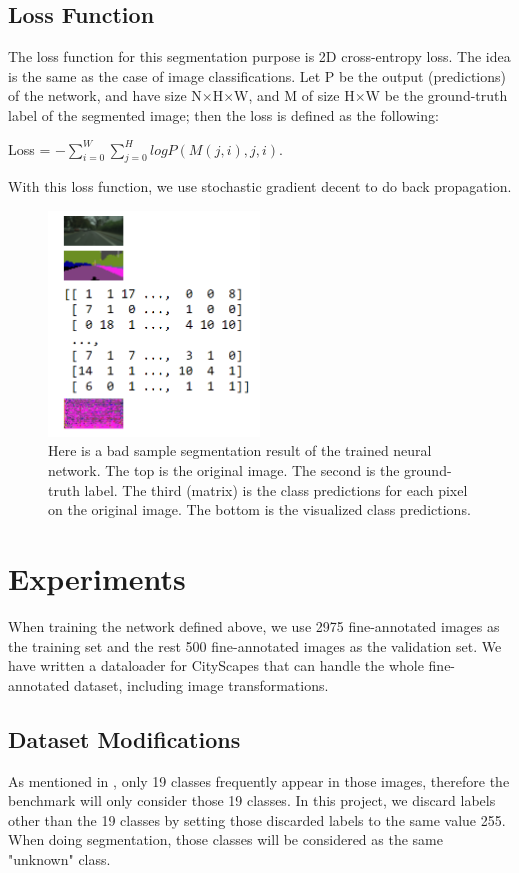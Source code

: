 \documentclass[10pt,twocolumn,letterpaper]{article}
\begin{document}
\subsection{Loss Function}
The loss function for this segmentation purpose is 2D cross-entropy loss. The idea is the same as the case of image classifications. Let P be the output (predictions) of the network, and have size N$\times$H$\times$W, and M of size H$\times$W be the ground-truth label of the segmented image; then the loss is defined as the following:
\begin{center}
	Loss = $-\sum_{i=0}^{W}\sum_{j=0}^{H}logP(M(j,i),j,i)$.
\end{center}
With this loss function, we use stochastic gradient decent to do back propagation.

\begin{figure}[t]
	\centering
	\includegraphics[width=0.50\textwidth]{bad_result.PNG}
	\caption{Here is a bad sample segmentation result of the trained neural network. The top is the original image. The second is the ground-truth label. The third (matrix) is the class predictions for each pixel on the original image. The bottom is the visualized class predictions.}
	\label{fig:leadfigure}
\end{figure}

\section{Experiments}
When training the network defined above, we use 2975 fine-annotated images as the training set and the rest 500 fine-annotated images as the validation set. We have written a dataloader for CityScapes that can handle the whole fine-annotated dataset, including image transformations.

\subsection{Dataset Modifications}
As mentioned in \cite{Cordts2016Cityscapes}, only 19 classes frequently appear in those images, therefore the benchmark will only consider those 19 classes. In this project, we discard labels other than the 19 classes by setting those discarded labels to the same value 255. When doing segmentation, those classes will be considered as the same "unknown" class.
\end{document}
